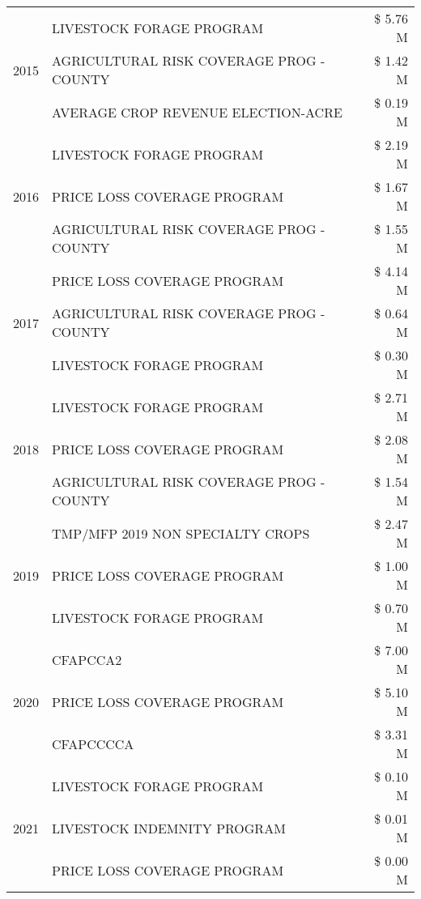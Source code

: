 \begin{tabular}{llr}
\multirow[t]{3}{*}{2015} & LIVESTOCK FORAGE PROGRAM & \$ 5.76 M \\
 & AGRICULTURAL RISK COVERAGE PROG - COUNTY & \$ 1.42 M \\
 & AVERAGE CROP REVENUE ELECTION-ACRE & \$ 0.19 M \\
\cline{1-3}
\multirow[t]{3}{*}{2016} & LIVESTOCK FORAGE PROGRAM & \$ 2.19 M \\
 & PRICE LOSS COVERAGE PROGRAM & \$ 1.67 M \\
 & AGRICULTURAL RISK COVERAGE PROG - COUNTY & \$ 1.55 M \\
\cline{1-3}
\multirow[t]{3}{*}{2017} & PRICE LOSS COVERAGE PROGRAM & \$ 4.14 M \\
 & AGRICULTURAL RISK COVERAGE PROG - COUNTY & \$ 0.64 M \\
 & LIVESTOCK FORAGE PROGRAM & \$ 0.30 M \\
\cline{1-3}
\multirow[t]{3}{*}{2018} & LIVESTOCK FORAGE PROGRAM & \$ 2.71 M \\
 & PRICE LOSS COVERAGE PROGRAM & \$ 2.08 M \\
 & AGRICULTURAL RISK COVERAGE PROG - COUNTY & \$ 1.54 M \\
\cline{1-3}
\multirow[t]{3}{*}{2019} & TMP/MFP 2019 NON SPECIALTY CROPS & \$ 2.47 M \\
 & PRICE LOSS COVERAGE PROGRAM & \$ 1.00 M \\
 & LIVESTOCK FORAGE PROGRAM & \$ 0.70 M \\
\cline{1-3}
\multirow[t]{3}{*}{2020} & CFAPCCA2 & \$ 7.00 M \\
 & PRICE LOSS COVERAGE PROGRAM & \$ 5.10 M \\
 & CFAPCCCCA & \$ 3.31 M \\
\cline{1-3}
\multirow[t]{3}{*}{2021} & LIVESTOCK FORAGE PROGRAM & \$ 0.10 M \\
 & LIVESTOCK INDEMNITY PROGRAM & \$ 0.01 M \\
 & PRICE LOSS COVERAGE PROGRAM & \$ 0.00 M \\
\cline{1-3}
\bottomrule
\end{tabular}

